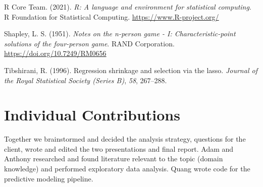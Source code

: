 \documentclass[
  12pt,
]{article}
\newlength{\cslhangindent}
\newlength{\cslentryspacingunit} %
\newenvironment{CSLReferences}[2] %
 {%
  \setlength{\parindent}{0pt}
  \ifodd #1
  \let\oldpar\par
  \def\par{\hangindent=\cslhangindent\oldpar}
  \fi
  \setlength{\parskip}{#2\cslentryspacingunit}
 }%
 {}
\begin{document}
\begin{CSLReferences}{1}{0}
\leavevmode{}%
R Core Team. (2021). \emph{R: A language and environment for statistical
computing}. R Foundation for Statistical Computing.
\url{https://www.R-project.org/}

\leavevmode{}%
Shapley, L. S. (1951). \emph{Notes on the n-person game - {I}:
Characteristic-point solutions of the four-person game}. RAND
Corporation. \url{https://doi.org/10.7249/RM0656}

\leavevmode{}%
Tibshirani, R. (1996). Regression shrinkage and selection via the lasso.
\emph{Journal of the Royal Statistical Society (Series B)}, \emph{58},
267--288.

\end{CSLReferences}

\newpage

\hypertarget{individual-contributions}{%
\section*{Individual Contributions}\label{individual-contributions}}

Together we brainstormed and decided the analysis strategy, questions
for the client, wrote and edited the two presentations and final report. Adam and
Anthony researched and found literature relevant to the topic (domain
knowledge) and performed exploratory data analysis. Quang wrote code for
the predictive modeling pipeline.
\end{document}
